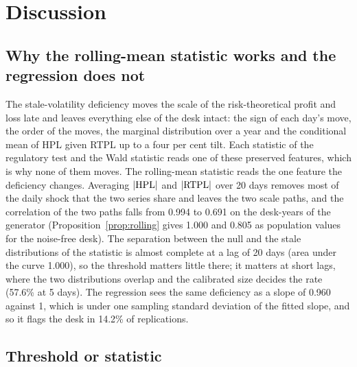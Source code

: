 \section{Discussion}
\label{sec:discussion}

\subsection{Why the rolling-mean statistic works and the regression does not}
\label{sec:discussion-why}

The stale-volatility deficiency moves the scale of the risk-theoretical profit and loss late and leaves everything else of the desk intact: the sign of each day's move, the order of the moves, the marginal distribution over a year and the conditional mean of HPL given RTPL up to a four per cent tilt.
Each statistic of the regulatory test and the Wald statistic reads one of these preserved features, which is why none of them moves.
The rolling-mean statistic reads the one feature the deficiency changes.
Averaging $|\mathrm{HPL}|$ and $|\mathrm{RTPL}|$ over 20 days removes most of the daily shock that the two series share and leaves the two scale paths, and the correlation of the two paths falls from 0.994 to 0.691 on the desk-years of the generator (Proposition~\ref{prop:rolling} gives 1.000 and 0.805 as population values for the noise-free desk).
The separation between the null and the stale distributions of the statistic is almost complete at a lag of 20 days (area under the curve 1.000), so the threshold matters little there; it matters at short lags, where the two distributions overlap and the calibrated size decides the rate (57.6\% at 5 days).
The regression sees the same deficiency as a slope of 0.960 against 1, which is under one sampling standard deviation of the fitted slope, and so it flags the desk in 14.2\% of replications.

\subsection{Threshold or statistic}
\label{sec:discussion-threshold}

